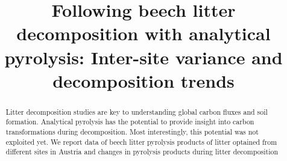 \documentclass[preprint,review,12pt]{elsarticle}
\begin{document}
\begin{frontmatter}



\title{Following beech litter decomposition with analytical pyrolysis: Inter-site variance and decomposition trends}


\author{}

\address{}

\begin{abstract}

Litter decomposition studies are key to understanding global carbon fluxes and soil formation. Analytical pyrolysis has the potential to provide insight into carbon transformations during decomposition. Most interestingly, this potential was not exploited yet. 
We report data of beech litter pyrolysis products of litter optained from different sites in Austria and changes in pyrolysis products during litter decomposition

\end{abstract}

\begin{keyword}


\end{keyword}

\end{frontmatter}
\linenumbers
\end{document}
